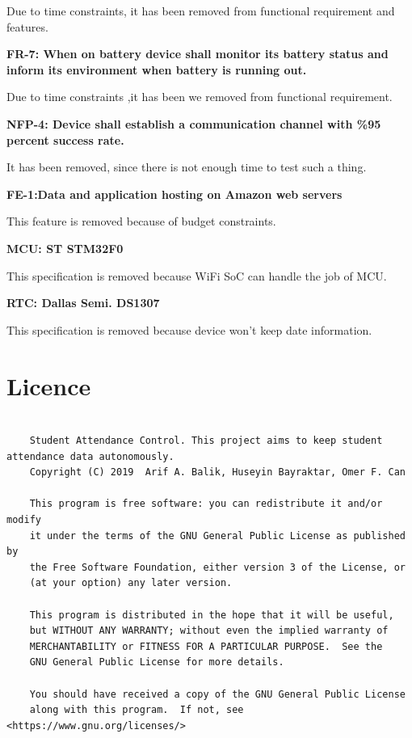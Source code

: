 \documentclass{article}
\begin{document}
Due to time constraints, it has been removed from functional requirement and features.

{\setlength{\parindent}{0cm}
\vspace{5mm}
\textbf{FR-7: When on battery device shall monitor its battery status and inform its environment when battery is running out.}
\vspace{5mm}
}

Due to time constraints ,it has been we removed from functional requirement.

{\setlength{\parindent}{0cm}
\vspace{5mm}
\textbf{NFP-4: Device shall establish a communication channel with \%95 percent success rate.}
\vspace{5mm}
}

It has been removed, since there is not enough time to test such a thing.

{\setlength{\parindent}{0cm}
\vspace{5mm}
\textbf{FE-1:Data and application hosting on Amazon web servers}
\vspace{5mm}
}

This feature is removed because of budget constraints.

{\setlength{\parindent}{0cm}
\vspace{5mm}
\textbf{MCU: ST STM32F0}
\vspace{5mm}
}

This specification is removed because WiFi SoC can handle the job of MCU.

{\setlength{\parindent}{0cm}
\vspace{5mm}
\textbf{RTC: Dallas Semi. DS1307}
\vspace{5mm}
}

This specification is removed because device won't keep date information.

\newpage
\section*{Licence}
\begin{verbatim}

    Student Attendance Control. This project aims to keep student attendance data autonomously.
    Copyright (C) 2019  Arif A. Balik, Huseyin Bayraktar, Omer F. Can

    This program is free software: you can redistribute it and/or modify
    it under the terms of the GNU General Public License as published by
    the Free Software Foundation, either version 3 of the License, or
    (at your option) any later version.

    This program is distributed in the hope that it will be useful,
    but WITHOUT ANY WARRANTY; without even the implied warranty of
    MERCHANTABILITY or FITNESS FOR A PARTICULAR PURPOSE.  See the
    GNU General Public License for more details.

    You should have received a copy of the GNU General Public License
    along with this program.  If not, see <https://www.gnu.org/licenses/>

\end{verbatim}
\end{document}
